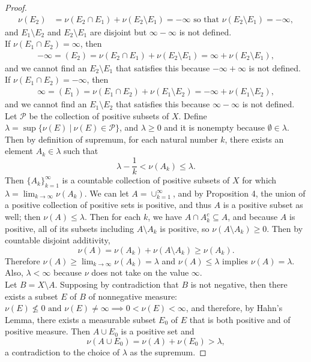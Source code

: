\begin{flushleft}
\begin{proof}
\begin{align*}
			\nu(E_2)&=\nu(E_2\cap E_1)+\nu(E_2\setminus E_1)=-\infty\text{ so that }\nu(E_2\setminus E_1)=-\infty,
		\end{align*}
		and $E_1\setminus E_2$ and $E_2\setminus E_1$ are disjoint but $\infty-\infty$ is not defined.
		\\If $\nu(E_1\cap E_2)=\infty$, then 
		\begin{align*}
			-\infty=(E_2)=\nu(E_2\cap E_1)+\nu(E_2\setminus E_1)=\infty+\nu(E_2\setminus E_1),
		\end{align*}
		and we cannot find an $E_2\setminus E_1$ that satisfies this because $-\infty+\infty$ is not defined.
		\\If $\nu(E_1\cap E_2)=-\infty$, then 
		\begin{align*}
			\infty=(E_1)=\nu(E_1\cap E_2)+\nu(E_1\setminus E_2)=-\infty+\nu(E_1\setminus E_2),
		\end{align*}
		and we cannot find an $E_1\setminus E_2$ that satisfies this because $\infty-\infty$ is not defined.
		\\\bigskip Let $\mathcal{P}$ be the collection of positive subsets of $X$.
		Define $\lambda=\sup\{\nu(E)\ |\ \nu(E)\in\mathcal{P}\}$, and $\lambda\ge0$ and it is nonempty because $\emptyset\in\lambda$.
		Then by definition of supremum, for each natural number $k$, there exists an element $A_k\in\lambda$ such that
		\[
			\lambda-\frac{1}{k}<\nu(A_k)\le\lambda.
		\]
		Then $\{A_k\}_{k=1}^\infty$ is a countable collection of positive subsets of $X$ for which $\lambda=\lim_{k\to\infty}\nu(A_k)$.
		We can let $A=\cup_{k=1}^\infty$, and by Proposition 4, the union of a positive collection of positive sets is positive, and thus $A$ is a positive subset as well; then $\nu(A)\le\lambda$.
		Then for each $k$, we have $A\cap A_k^c\subseteq A$, and because $A$ is positive, all of its subsets including $A\setminus A_k$ is positive, so $\nu(A\setminus A_k)\ge0$.
		Then by countable disjoint additivity,
		\[
			\nu(A)=\nu(A_k)+\nu(A\setminus A_k)\ge\nu(A_k).
		\]
		Therefore $\nu(A)\ge\lim_{k\to\infty}\nu(A_k)=\lambda$ and $\nu(A)\le\lambda$ implies $\nu(A)=\lambda$.
		Also, $\lambda<\infty$ because $\nu$ does not take on the value $\infty$.
		\\Let $B=X\setminus A$.
		Supposing by contradiction that $B$ is not negative, then there exists a subset $E$ of $B$ of nonnegative measure: $\nu(E)\not\le0\text{ and }\nu(E)\neq\infty\implies 0<\nu(E)<\infty$, and therefore, by Hahn's Lemma, there exists a measurable subset $E_0$ of $E$ that is both positive and of positive measure.
		Then $A\cup E_0$ is a positive set and 
		\[
			\nu(A\cup E_0)=\nu(A)+\nu(E_0)>\lambda,
		\]
		a contradiction to the choice of $\lambda$ as the supremum.
	\end{proof}

\end{flushleft}
